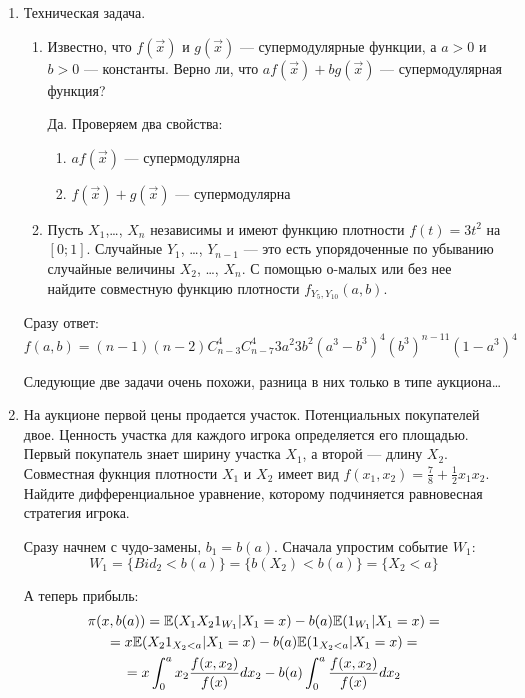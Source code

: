 \begin{enumerate}

\item Техническая задача. 
\begin{enumerate}
\item Известно, что $ f(\vec{x}) $ и $ g(\vec{x}) $ --- супермодулярные функции, а $ a>0 $ и $ b>0 $ --- константы. Верно ли, что $ af(\vec{x})+bg(\vec{x}) $ --- супермодулярная функция?

Да. Проверяем два свойства: 
\begin{enumerate}
\item $ af(\vec{x}) $ --- супермодулярна
\item $ f(\vec{x})+g(\vec{x}) $ --- супермодулярна
\end{enumerate}

\item Пусть $ X_{1} $,\ldots, $ X_{n} $ независимы и имеют функцию плотности $ f(t)=3t^{2} $ на $ [0;1] $. Случайные $ Y_{1} $, \ldots, $ Y_{n-1} $ --- это есть упорядоченные по убыванию случайные величины $ X_{2} $, \ldots, $ X_{n} $. С помощью о-малых или без нее найдите совместную функцию плотности $ f_{Y_{5},Y_{10}}(a,b) $.
\end{enumerate}

Сразу ответ: $ f(a,b)=(n-1)(n-2)C_{n-3}^{4}C_{n-7}^{4}3a^{2}3b^{2}(a^{3}-b^{3})^{4}(b^{3})^{n-11}(1-a^{3})^{4} $

Следующие две задачи очень похожи, разница в них только в типе аукциона\ldots

\item На аукционе первой цены продается участок. Потенциальных покупателей двое. Ценность участка для каждого игрока определяется его площадью. Первый покупатель знает ширину участка $ X_{1} $, а второй --- длину $X_{2}$. Совместная фукнция плотности $ X_{1} $ и $ X_{2} $ имеет вид $ f(x_{1},x_{2})=\frac{7}{8}+\frac{1}{2}x_{1}x_{2} $. Найдите дифференциальное уравнение, которому подчиняется равновесная стратегия игрока. 


Сразу начнем с чудо-замены, $ b_{1}=b(a) $. Сначала упростим событие $ W_{1} $:
\begin{equation}
W_{1}=\{Bid_{2}<b(a)\}=\{b(X_{2})<b(a)\}=\{X_{2}<a\}
\end{equation}

А теперь прибыль:
\begin{multline}
\pi(x,b(a))=\mathbb{E}(X_{1}X_{2}1_{W_{1}}|X_{1}=x)-b(a)\mathbb{E}(1_{W_{1}}|X_{1}=x)=\\
=x\mathbb{E}(X_{2}1_{X_{2}<a}|X_{1}=x)-b(a)\mathbb{E}(1_{X_{2}<a}|X_{1}=x)=\\
=x\int_{0}^{a}x_{2}\frac{f(x,x_{2})}{f(x)}dx_{2}-b(a)\int_{0}^{a}\frac{f(x,x_{2})}{f(x)}dx_{2}
\end{multline}



\end{enumerate}
